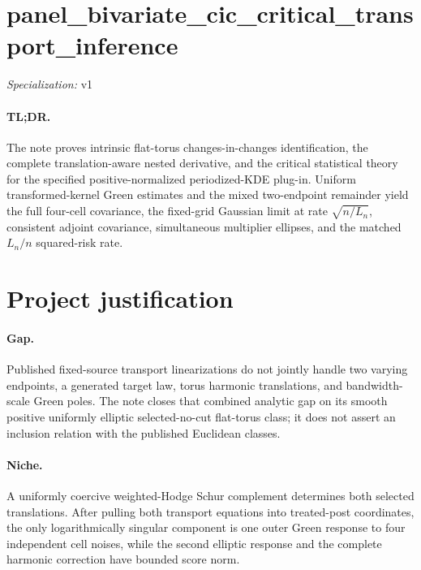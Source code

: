 \documentclass{article}
\begin{document}
\sloppy

\section*{panel\_\allowbreak{}bivariate\_\allowbreak{}cic\_\allowbreak{}critical\_\allowbreak{}transport\_\allowbreak{}inference}

\noindent\textit{Specialization:} v1\par

\paragraph{TL;DR.} The note proves intrinsic flat-torus changes-in-changes identification, the complete translation-aware nested derivative, and the critical statistical theory for the specified positive-normalized periodized-KDE plug-in.  Uniform transformed-kernel Green estimates and the mixed two-endpoint remainder yield the full four-cell covariance, the fixed-grid Gaussian limit at rate \(\sqrt{n/L_n}\), consistent adjoint covariance, simultaneous multiplier ellipses, and the matched \(L_n/n\) squared-risk rate.

\section{Project justification}

\paragraph{Gap.} Published fixed-source transport linearizations do not jointly handle two varying endpoints, a generated target law, torus harmonic translations, and bandwidth-scale Green poles.  The note closes that combined analytic gap on its smooth positive uniformly elliptic selected-no-cut flat-torus class; it does not assert an inclusion relation with the published Euclidean classes.

\paragraph{Niche.} A uniformly coercive weighted-Hodge Schur complement determines both selected translations.  After pulling both transport equations into treated-post coordinates, the only logarithmically singular component is one outer Green response to four independent cell noises, while the second elliptic response and the complete harmonic correction have bounded score norm.
\end{document}
